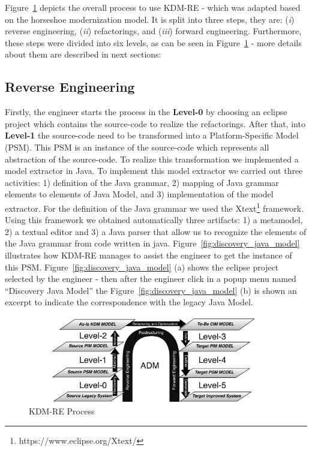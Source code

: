 Figure~\ref{fig:process} depicts the overall process to use KDM-RE - which was adapted based on the horseshoe modernization model. 
It is split into three steps, they are: 
(\textit{i}) reverse engineering, 
(\textit{ii}) refactorings, and 
(\textit{iii}) forward engineering. 
Furthermore, these steps were divided into six levels, as can be seen in Figure~\ref{fig:process} - more details about them are described in next sections:

\subsection{Reverse Engineering}

Firstly, the engineer starts the process in the \textbf{Level-0} by choosing an eclipse project which contains the source-code to realize the refactorings.  
After that, into \textbf{Level-1} the source-code need to be transformed into a Platform-Specific Model (PSM). 
This PSM is an instance of the source-code which represents all abstraction of the source-code. To realize this transformation we implemented a model extractor in Java. To implement this model extractor we carried out three activities: 1) definition of the Java grammar, 2) mapping of Java grammar elements to elements of Java Model, and 3) implementation of the model extractor. For the definition of the Java grammar we used the Xtext\footnote{https://www.eclipse.org/Xtext/} framework. Using this framework we obtained automatically three artifacts: 1) a metamodel, 2) a textual editor and 3) a Java parser that allow us to recognize the elements of the Java grammar from code written in java. 
Figure~\ref{fig:discovery_java_model} illustrates how KDM-RE manages to assist the engineer to get the instance of this PSM. Figure~\ref{fig:discovery_java_model} (a) shows the eclipse project selected by the engineer - then after the engineer click in a popup menu named ``Discovery Java Model'' the Figure~\ref{fig:discovery_java_model} (b) is shown an excerpt to indicate the correspondence with the legacy Java Model.

\begin{figure}[!ht]
\centering
  \includegraphics[width=11cm, height=3.8cm]{figure/processoDaFerramenta}
\caption{KDM-RE Process}
\label{fig:process}
\end{figure} 

